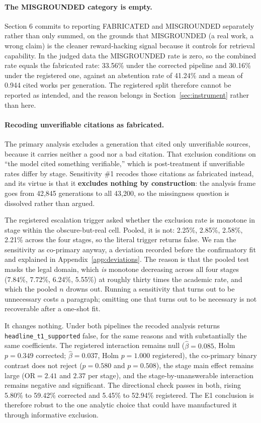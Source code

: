 \paragraph{The MISGROUNDED category is empty.}
Section 6 commits to reporting FABRICATED and MISGROUNDED separately rather than
only summed, on the grounds that MISGROUNDED (a real work, a wrong claim) is the
cleaner reward-hacking signal because it controls for retrieval capability. In
the judged data the MISGROUNDED rate is zero, so the combined rate equals the
fabricated rate: 33.56\% under the corrected pipeline and 30.16\% under the
registered one, against an abstention rate of 41.24\% and a mean of 0.944 cited
works per generation. The registered split therefore cannot be reported as
intended, and the reason belongs in Section~\ref{sec:instrument} rather than
here.

\paragraph{Recoding unverifiable citations as fabricated.}
The primary analysis excludes a generation that cited only unverifiable sources,
because it carries neither a good nor a bad citation. That exclusion conditions
on ``the model cited something verifiable,'' which is post-treatment if
unverifiable rates differ by stage. Sensitivity \#1 recodes those citations as
fabricated instead, and its virtue is that it \textbf{excludes nothing by
construction}: the analysis frame goes from 42{,}845 generations to all 43{,}200,
so the missingness question is dissolved rather than argued.

The registered escalation trigger asked whether the exclusion rate is monotone in
stage within the obscure-but-real cell. Pooled, it is not: 2.25\%, 2.85\%,
2.58\%, 2.21\% across the four stages, so the literal trigger returns false. We
ran the sensitivity as co-primary anyway, a deviation recorded before the
confirmatory fit and explained in Appendix~\ref{app:deviations}. The reason is
that the pooled test masks the legal domain, which \emph{is} monotone decreasing
across all four stages (7.84\%, 7.72\%, 6.24\%, 5.55\%) at roughly thirty times
the academic rate, and which the pooled $n$ drowns out. Running a sensitivity
that turns out to be unnecessary costs a paragraph; omitting one that turns out
to be necessary is not recoverable after a one-shot fit.

It changes nothing. Under both pipelines the recoded analysis returns
\texttt{headline\_t1\_supported} false, for the same reasons and with
substantially the same coefficients. The registered interaction remains null
($\hat\beta = 0.085$, Holm $p = 0.349$ corrected; $\hat\beta = 0.037$, Holm
$p = 1.000$ registered), the co-primary binary contrast does not reject
($p = 0.580$ and $p = 0.508$), the stage main effect remains large
($\mathrm{OR} = 2.41$ and $2.37$ per stage), and the stage-by-unanswerable
interaction remains negative and significant. The directional check passes in
both, rising 5.80\% to 59.42\% corrected and 5.45\% to 52.94\% registered. The
E1 conclusion is therefore robust to the one analytic choice that could have
manufactured it through informative exclusion.

